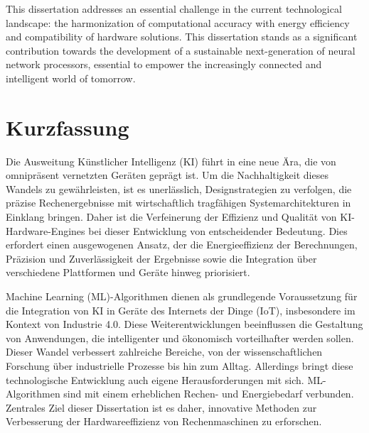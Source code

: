 This dissertation addresses an essential challenge in the current technological landscape: the harmonization of computational accuracy with energy efficiency and compatibility of hardware solutions. This dissertation stands as a significant contribution towards the development of a sustainable next-generation of neural network processors, essential to empower the increasingly connected and intelligent world of tomorrow.

\chapter*{Kurzfassung}
\thispagestyle{empty}

Die Ausweitung K\"unstlicher Intelligenz (KI) f\"uhrt in eine neue \"Ara, die von omnipr\"asent  vernetzten Ger\"aten gepr\"agt ist. Um die Nachhaltigkeit dieses Wandels zu gew\"ahrleisten, ist es unerl\"asslich, Designstrategien zu verfolgen, die pr\"azise Rechenergebnisse mit wirtschaftlich tragf\"ahigen Systemarchitekturen in Einklang bringen. Daher ist die Verfeinerung der Effizienz und Qualit\"at von KI-Hardware-Engines bei dieser Entwicklung von entscheidender Bedeutung. Dies erfordert einen ausgewogenen Ansatz, der die Energieeffizienz der Berechnungen, Pr\"azision und Zuverl\"assigkeit der Ergebnisse sowie die Integration \"uber verschiedene Plattformen und Ger\"ate hinweg priorisiert.

Machine Learning (ML)-Algorithmen dienen als grundlegende Voraussetzung f\"ur die Integration von KI in Ger\"ate des Internets der Dinge (IoT), insbesondere im Kontext von Industrie 4.0. Diese Weiterentwicklungen beeinflussen die Gestaltung von Anwendungen, die intelligenter und \"okonomisch vorteilhafter werden sollen. Dieser Wandel verbessert zahlreiche Bereiche, von der wissenschaftlichen Forschung \"uber industrielle Prozesse bis hin zum Alltag. Allerdings bringt diese technologische Entwicklung auch eigene Herausforderungen mit sich. ML-Algorithmen sind mit einem erheblichen Rechen- und Energiebedarf verbunden. Zentrales Ziel dieser Dissertation ist es daher, innovative Methoden zur Verbesserung der Hardwareeffizienz von Rechenmaschinen zu erforschen.

